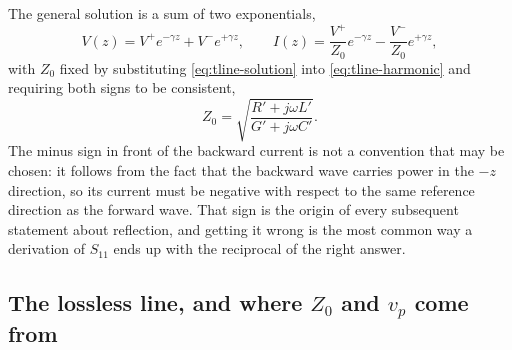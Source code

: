 The general solution is a sum of two exponentials,
\begin{equation}
  V(z) = V^{+}e^{-\gamma z} + V^{-}e^{+\gamma z}, \qquad
  I(z) = \frac{V^{+}}{Z_0}e^{-\gamma z} - \frac{V^{-}}{Z_0}e^{+\gamma z},
  \label{eq:tline-solution}
\end{equation}
with $Z_0$ fixed by substituting \eqref{eq:tline-solution} into \eqref{eq:tline-harmonic} and requiring both
signs to be consistent,
\begin{equation}
  Z_0 = \sqrt{\frac{R' + j\omega L'}{G' + j\omega C'}} .
  \label{eq:tline-z0-general}
\end{equation}
The minus sign in front of the backward current is not a convention that may be chosen: it follows from the
fact that the backward wave carries power in the $-z$ direction, so its current must be negative with respect
to the same reference direction as the forward wave. That sign is the origin of every subsequent statement
about reflection, and getting it wrong is the most common way a derivation of $S_{11}$ ends up with the
reciprocal of the right answer.

\subsection{The lossless line, and where $Z_0$ and $v_p$ come from}
\label{sec:tline-lossless}

